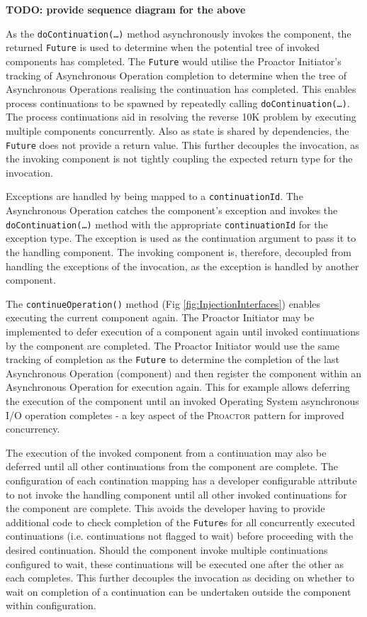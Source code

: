\documentclass[prodmode]{style/acmlarge}
\begin{document}
\textbf{TODO: provide sequence diagram for the above}

As the \texttt{doContinuation(\ldots)} method asynchronously invokes the
component, the returned \texttt{Future} is used to determine when the potential
tree of invoked components has completed.  The \texttt{Future} would utilise the
Proactor Initiator's tracking of Asynchronous Operation completion to determine
when the tree of Asynchronous Operations realising the continuation has
completed.  This enables process continuations \cite{process-continuation} to be
spawned by repeatedly calling \texttt{doContinuation(\ldots)}.  The process
continuations aid in resolving the reverse 10K problem
\cite{reverse-ten-k-problem} by executing multiple components concurrently.
Also as state is shared by dependencies, the \texttt{Future} does not provide a
return value.  This further decouples the invocation, as the invoking component
is not tightly coupling the expected return type for the invocation.

Exceptions are handled by being mapped to a \texttt{continuationId}.  The
Asynchronous Operation catches the component's exception and invokes the
\texttt{doContinuation(\ldots)} method with the appropriate
\texttt{continuationId} for the exception type.  The exception is used as the
continuation argument to pass it to the handling component.  The invoking
component is, therefore, decoupled from handling the exceptions of the
invocation, as the exception is handled by another component.

The \texttt{continueOperation()} method (Fig \ref{fig:InjectionInterfaces})
enables executing the current component again.  The Proactor Initiator may be
implemented to defer execution of a component again until invoked continuations
by the component are completed.  The Proactor Initiator would use the same
tracking of completion as the \texttt{Future} to determine the completion of the
last Asynchronous Operation (component) and then register the component within
an Asynchronous Operation for execution again.  This for example allows
deferring the execution of the component until an invoked Operating System
asynchronous I/O operation completes - a key aspect of the \textsc{Proactor}
pattern for improved concurrency.

The execution of the invoked component from a continuation may also be deferred
until all other continuations from the component are complete.  The
configuration of each contination mapping has a developer configurable attribute
to not invoke the handling component until all other invoked continuations for
the component are complete.  This avoids the developer having to provide
additional code to check completion of the \texttt{Future}s for all concurrently
executed continuations (i.e. continuations not flagged to wait) before
proceeding with the desired continuation.  Should the component invoke multiple
continuations configured to wait, these continuations will be executed one after
the other as each completes.  This further decouples the invocation as deciding
on whether to wait on completion of a continuation can be undertaken outside the
component within configuration.
\end{document}

